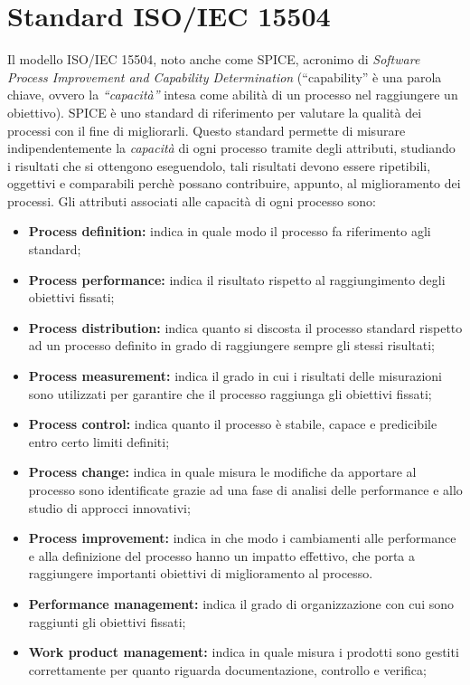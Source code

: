 \chapter{Standard ISO/IEC 15504}\label{Standard ISO/IEC 15504}
Il modello ISO/IEC 15504, noto anche come SPICE, acronimo di \textit{Software Process Improvement and Capability Determination} (“capability” è una parola chiave, ovvero la \textit{“capacità”} intesa come abilità di un processo nel raggiungere un obiettivo).
SPICE è uno standard di riferimento per valutare la qualità dei processi con il fine di migliorarli.
Questo standard permette di misurare indipendentemente la \textit{capacità} di ogni processo tramite degli attributi, studiando i risultati che si ottengono eseguendolo, tali risultati devono essere ripetibili, oggettivi e comparabili perchè possano contribuire, appunto, al miglioramento dei processi.
Gli attributi associati alle capacità di ogni processo sono:
\begin{itemize}
	\item \textbf{Process definition:} indica in quale modo il processo fa riferimento agli standard;
	\item \textbf{Process performance:} indica il risultato rispetto al raggiungimento degli 
		obiettivi fissati;
	\item \textbf{Process distribution:} indica quanto si discosta il processo standard rispetto ad un processo 
		definito in grado di raggiungere sempre gli stessi risultati; 
	\item \textbf{Process measurement:} indica il grado in cui i risultati delle misurazioni
		sono utilizzati per garantire che il processo raggiunga gli obiettivi fissati;
	\item \textbf{Process control:} indica quanto il processo è stabile, capace e predicibile 
		entro certo limiti definiti;
	\item \textbf{Process change:} indica in quale misura le modifiche da apportare al processo sono
	identificate grazie ad una fase di analisi delle performance e allo studio di approcci innovativi;
	\item \textbf{Process improvement:} indica in che modo i cambiamenti alle performance e alla definizione del processo 
		hanno un impatto effettivo, che porta a raggiungere importanti obiettivi di miglioramento al processo.
	\item \textbf{Performance management:} indica il grado di organizzazione con cui sono raggiunti gli obiettivi fissati;
	\item \textbf{Work product management:} indica in quale misura i prodotti sono gestiti correttamente per quanto riguarda documentazione, controllo e verifica;
\end{itemize}
